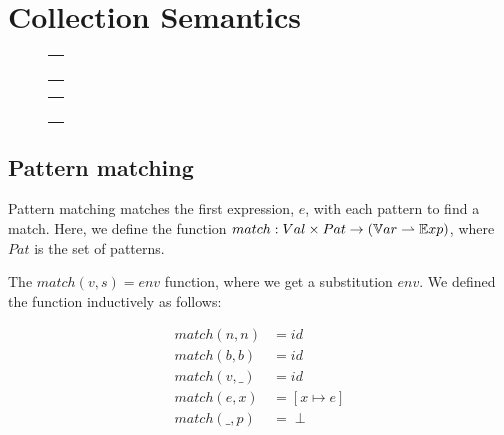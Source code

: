 \documentclass[../../master.tex]{subfiles}
\begin{document}
	
\section{Collection Semantics}\label{App:ColSem}
\begin{figure}[H]
	\setlength\tabcolsep{8pt}
	\begin{tabular}{l}
		\\[1cm]
		\\[1cm]
		\\[1cm]
		\\[1cm]
		\\[1cm]
		
	\end{tabular}
	\label{fig:InfDV}
\end{figure}

\begin{figure}[H]
	\setlength\tabcolsep{8pt}
	\begin{tabular}{l}
		\\[1cm]
		\\[1cm]
		\\[1cm]
		\\[1cm]
		\\[1cm]
		
	\end{tabular}
	\label{fig:InfDV}
\end{figure}

\subsection{Pattern matching}
Pattern matching matches the first expression, $e$, with each pattern to find a match.
Here, we define the function $match:Val \times Pat \rightarrow (\mathbb{V}ar \rightharpoonup \mathbb{E}xp)$, where $Pat$ is the set of patterns.

The $match(v,s)=env$ function, where we get a substitution $env$.
We defined the function inductively as follows:

\begin{align*}
	match(n,n) &= id\\
	match(b,b) &= id\\
	match(v,\_) &=id\\
	match(e,x) &= [x \mapsto e]\\
	match(\_,p) &= \perp
\end{align*}
\end{document}
